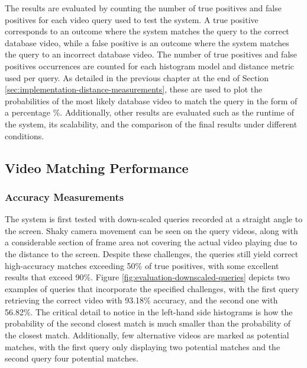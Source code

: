The results are evaluated by counting the number of true positives and false positives for each video query used to test the system. A true positive corresponds to an outcome where the system matches the query to the correct database video, while a false positive is an outcome where the system matches the query to an incorrect database video. The number of true positives and false positives occurrences are counted for each histogram model and distance metric used per query. As detailed in the previous chapter at the end of Section \ref{sec:implementation-distance-measurements}, these are used to plot the probabilities of the most likely database video to match the query in the form of a percentage \%. Additionally, other results are evaluated such as the runtime of the system, its scalability, and the comparison of the final results under different conditions.


\subsection{Video Matching Performance}

\subsubsection{Accuracy Measurements}

The system is first tested with down-scaled queries recorded at a straight angle to the screen. Shaky camera movement can be seen on the query videos, along with a considerable section of frame area not covering the actual video playing due to the distance to the screen. Despite these challenges, the queries still yield correct high-accuracy matches exceeding 50\% of true positives, with some excellent results that exceed 90\%. Figure \ref{fig:evaluation-downscaled-queries} depicts two examples of queries that incorporate the specified challenges, with the first query retrieving the correct video with 93.18\% accuracy, and the second one with 56.82\%. The critical detail to notice in the left-hand side histograms is how the probability of the second closest match is much smaller than the probability of the closest match. Additionally, few alternative videos are marked as potential matches, with the first query only displaying two potential matches and the second query four potential matches. %

